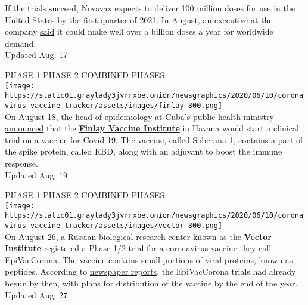 If the trials succeed, Novavax expects to deliver 100 million doses for
use in the United States by the first quarter of 2021. In August, an
executive at the company
\href{https://www.fiercepharma.com/pharma/novavax-aims-for-billions-covid-19-vaccine-doses-2021-more-than-enough-to-supply-u-s}{said}
it could make well over a billion doses a year for worldwide demand.\\
Updated Aug. 17

PHASE 1 PHASE 2 COMBINED PHASES\\
\texttt{[image: https://static01.graylady3jvrrxbe.onion/newsgraphics/2020/06/10/coronavirus-vaccine-tracker/assets/images/finlay-800.png]}\\
On August 18, the head of epidemiology at Cuba's public health ministry
\href{https://www.dw.com/en/cuba-joins-the-race-for-vaccine-against-the-coronavirus/a-54615364}{announced}
that the \textbf{\href{https://www.finlay.edu.cu/en/}{Finlay Vaccine
Institute}} in Havana would start a clinical trial on a vaccine for
Covid-19. The vaccine, called
\href{https://rpcec.sld.cu/ensayos/RPCEC00000332-Sp}{Soberana 1},
contains a part of the spike protein, called RBD, along with an adjuvant
to boost the immune response.\\
Updated Aug. 19

PHASE 1 PHASE 2 COMBINED PHASES\\
\texttt{[image: https://static01.graylady3jvrrxbe.onion/newsgraphics/2020/06/10/coronavirus-vaccine-tracker/assets/images/vector-800.png]}\\
On August 26, a Russian biological research center known as the
\textbf{Vector Institute}
\href{https://clinicaltrials.gov/ct2/show/NCT04527575}{registered} a
Phase 1/2 trial for a coronavirus vaccine they call EpiVacCorona. The
vaccine contains small portions of viral proteins, known as peptides.
According to
\href{https://www.dailymail.co.uk/news/article-8656073/Second-Covid-vaccine-released-Russia-avoids-effects-one.html}{newspaper
reports}, the EpiVacCorona trials had already begun by then, with plans
for distribution of the vaccine by the end of the year.\\
Updated Aug. 27

